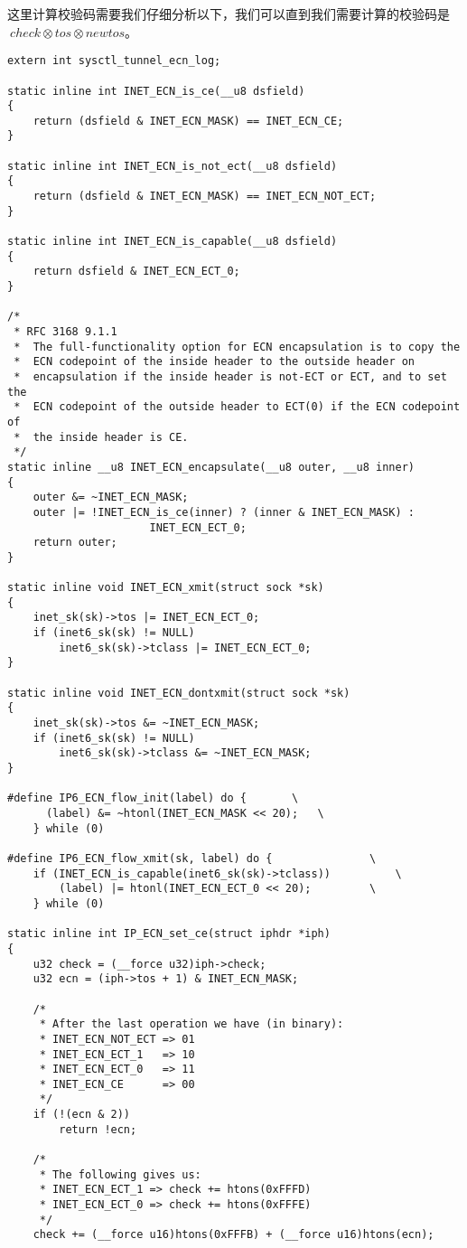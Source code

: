 		这里计算校验码需要我们仔细分析以下，我们可以直到我们需要计算的校验码是$~check\otimes tos \otimes newtos$。
\begin{verbatim}
extern int sysctl_tunnel_ecn_log;

static inline int INET_ECN_is_ce(__u8 dsfield)
{
	return (dsfield & INET_ECN_MASK) == INET_ECN_CE;
}

static inline int INET_ECN_is_not_ect(__u8 dsfield)
{
	return (dsfield & INET_ECN_MASK) == INET_ECN_NOT_ECT;
}

static inline int INET_ECN_is_capable(__u8 dsfield)
{
	return dsfield & INET_ECN_ECT_0;
}

/*
 * RFC 3168 9.1.1
 *  The full-functionality option for ECN encapsulation is to copy the
 *  ECN codepoint of the inside header to the outside header on
 *  encapsulation if the inside header is not-ECT or ECT, and to set the
 *  ECN codepoint of the outside header to ECT(0) if the ECN codepoint of
 *  the inside header is CE.
 */
static inline __u8 INET_ECN_encapsulate(__u8 outer, __u8 inner)
{
	outer &= ~INET_ECN_MASK;
	outer |= !INET_ECN_is_ce(inner) ? (inner & INET_ECN_MASK) :
					  INET_ECN_ECT_0;
	return outer;
}

static inline void INET_ECN_xmit(struct sock *sk)
{
	inet_sk(sk)->tos |= INET_ECN_ECT_0;
	if (inet6_sk(sk) != NULL)
		inet6_sk(sk)->tclass |= INET_ECN_ECT_0;
}

static inline void INET_ECN_dontxmit(struct sock *sk)
{
	inet_sk(sk)->tos &= ~INET_ECN_MASK;
	if (inet6_sk(sk) != NULL)
		inet6_sk(sk)->tclass &= ~INET_ECN_MASK;
}

#define IP6_ECN_flow_init(label) do {		\
      (label) &= ~htonl(INET_ECN_MASK << 20);	\
    } while (0)

#define	IP6_ECN_flow_xmit(sk, label) do {				\
	if (INET_ECN_is_capable(inet6_sk(sk)->tclass))			\
		(label) |= htonl(INET_ECN_ECT_0 << 20);			\
    } while (0)

static inline int IP_ECN_set_ce(struct iphdr *iph)
{
	u32 check = (__force u32)iph->check;
	u32 ecn = (iph->tos + 1) & INET_ECN_MASK;

	/*
	 * After the last operation we have (in binary):
	 * INET_ECN_NOT_ECT => 01
	 * INET_ECN_ECT_1   => 10
	 * INET_ECN_ECT_0   => 11
	 * INET_ECN_CE      => 00
	 */
	if (!(ecn & 2))
		return !ecn;

	/*
	 * The following gives us:
	 * INET_ECN_ECT_1 => check += htons(0xFFFD)
	 * INET_ECN_ECT_0 => check += htons(0xFFFE)
	 */
	check += (__force u16)htons(0xFFFB) + (__force u16)htons(ecn);


\end{verbatim}
